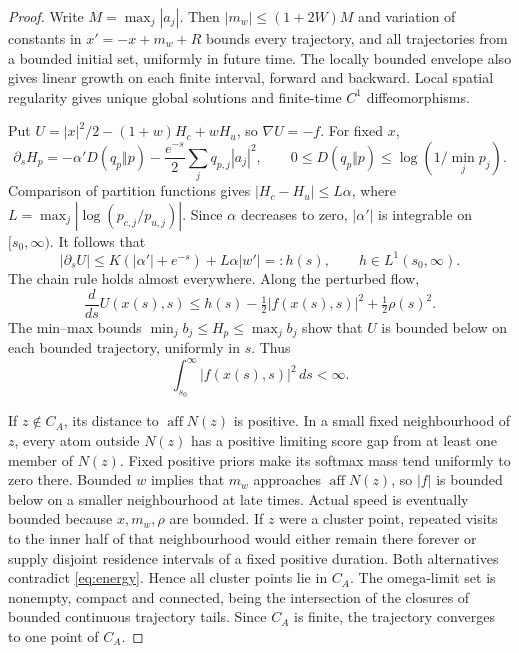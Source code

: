 \documentclass[11pt]{article}
\newcommand{\aff}{\operatorname{aff}}
\begin{document}
\begin{proof}
Write $M=\max_j|a_j|$. Then $|m_w|\le(1+2W)M$ and variation of constants in
$x'=-x+m_w+R$ bounds every trajectory, and all trajectories from a bounded
initial set, uniformly in future time. The locally bounded envelope also gives
linear growth on each finite interval, forward and backward. Local spatial
regularity gives unique global solutions and finite-time $C^1$ diffeomorphisms.

Put $U=|x|^2/2-(1+w)H_c+wH_u$, so $\nabla U=-f$. For fixed $x$,
\[
 \partial_s H_p=-\alpha'D(q_p\Vert p)
 -\frac{e^{-s}}2\sum_jq_{p,j}|a_j|^2,
 \qquad 0\le D(q_p\Vert p)\le\log(1/\min_jp_j).
\]
Comparison of partition functions gives
$|H_c-H_u|\le L\alpha$, where
$L=\max_j|\log(p_{c,j}/p_{u,j})|$. Since $\alpha$ decreases to zero,
$|\alpha'|$ is integrable on $[s_0,\infty)$. It follows that
\[
 |\partial_s U|\le K(|\alpha'|+e^{-s})+L\alpha|w'|=:h(s),
 \qquad h\in L^1(s_0,\infty).
\]
The chain rule holds almost everywhere. Along the perturbed flow,
\[
 \frac d{ds}U(x(s),s)
 \le h(s)-\tfrac12|f(x(s),s)|^2+\tfrac12\rho(s)^2.
\]
The min--max bounds $\min_jb_j\le H_p\le\max_jb_j$ show that $U$ is bounded
below on each bounded trajectory, uniformly in $s$. Thus
\begin{equation}\label{eq:energy}
 \int_{s_0}^\infty|f(x(s),s)|^2\,ds<\infty.
\end{equation}

If $z\notin C_A$, its distance to $\aff N(z)$ is positive. In a small fixed
neighbourhood of $z$, every atom outside $N(z)$ has a positive limiting score
gap from at least one member of $N(z)$. Fixed positive priors make its softmax
mass tend uniformly to zero there. Bounded $w$ implies that $m_w$ approaches
$\aff N(z)$, so $|f|$ is bounded below on a smaller neighbourhood at late
times. Actual speed is eventually bounded because $x,m_w,\rho$ are bounded.
If $z$ were a cluster point, repeated visits to the inner half of that
neighbourhood would either remain there forever or supply disjoint residence
intervals of a fixed positive duration. Both alternatives contradict
\eqref{eq:energy}. Hence all cluster points lie in $C_A$. The omega-limit set
is nonempty, compact and connected, being the intersection of the closures of
bounded continuous trajectory tails. Since $C_A$ is finite, the trajectory
converges to one point of $C_A$.


\end{proof}
\end{document}
